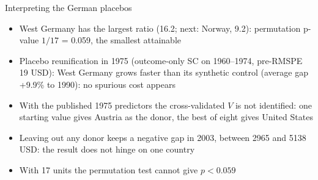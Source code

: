\begin{frame}{Interpreting the German placebos}
\itemsize{\small}
\begin{itemize}
    \item West Germany has the largest ratio (16.2; next: Norway, 9.2): permutation p-value $1/17$ = 0.059, the smallest attainable
    \item Placebo reunification in 1975 (outcome-only SC on 1960--1974, pre-RMSPE 19 USD): West Germany grows faster than its synthetic control (average gap +9.9\% to 1990): no spurious cost appears
    \item With the published 1975 predictors the cross-validated $V$ is not identified: one starting value gives Austria as the donor, the best of eight gives United States 
    \item Leaving out any donor keeps a negative gap in 2003, between 2965 and 5138 USD: the result does not hinge on one country
    \item With 17 units the permutation test cannot give $p < 0.059$
\end{itemize}
\end{frame}

